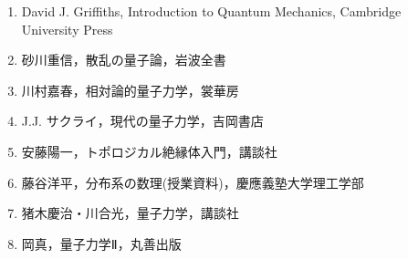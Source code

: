 \documentclass{report}
\begin{document}
  \begin{enumerate}
    \item David J. Griffiths, Introduction to Quantum Mechanics, Cambridge University Press
    \item 砂川重信，散乱の量子論，岩波全書
    \item 川村嘉春，相対論的量子力学，裳華房
    \item J.J. サクライ，現代の量子力学，吉岡書店
    \item 安藤陽一，トポロジカル絶縁体入門，講談社
    \item 藤谷洋平，分布系の数理(授業資料)，慶應義塾大学理工学部
    \item 猪木慶治・川合光，量子力学，講談社
    \item 岡真，量子力学Ⅱ，丸善出版
  \end{enumerate}
\end{document}
